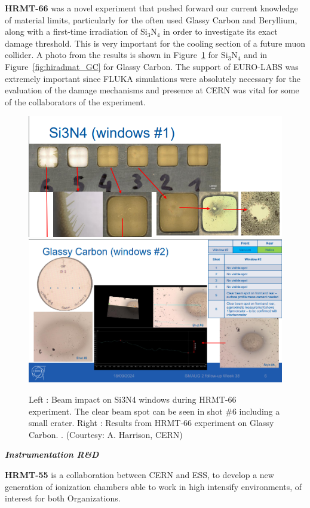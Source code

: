 \textbf{HRMT-66} was a novel experiment that pushed forward our current knowledge of material limits, particularly for the often used Glassy Carbon and Beryllium, along with a first-time irradiation of Si$_{3}$N$_{4}$ in order to investigate its exact damage threshold. This is very important for the cooling section of a future muon collider. A photo from the results is shown in Figure~\ref{fig:hiradmat_Si3N4} for Si$_{3}$N$_{4}$ and in Figure~\ref{fig:hiradmat_GC} for Glassy Carbon. The support of EURO-LABS was extremely important since FLUKA simulations were absolutely necessary for the evaluation of the damage mechanisms and presence at CERN was vital for some of the collaborators of the experiment.
\begin{figure}[H]
    \centering
    \includegraphics[width=0.48\linewidth]{graphics/hiradmat_si3n4.png}
    \includegraphics[width=0.48\linewidth]{graphics/hiradmat_GC.png}
    \caption{Left : Beam impact on Si3N4 windows during HRMT-66 experiment. The clear beam spot can be seen in shot \#6 including a small crater. Right : Results from HRMT-66 experiment on Glassy Carbon. . (Courtesy: A. Harrison, CERN)}
    \label{fig:hiradmat_Si3N4}
\end{figure}


\textbf{\textit{Instrumentation R\&D}} \mbox{}

\textbf{HRMT-55} is a collaboration between CERN and ESS, to develop a new generation of ionization chambers able to work in high intensify environments, of interest for both Organizations.

